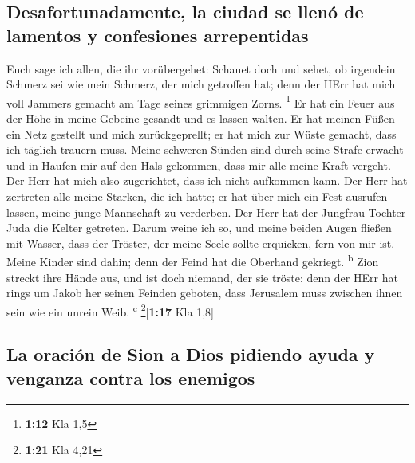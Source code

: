 \hypertarget{desafortunadamente-la-ciudad-se-llenuxf3-de-lamentos-y-confesiones-arrepentidas}{%
\subsection{Desafortunadamente, la ciudad se llenó de lamentos y
confesiones
arrepentidas}\label{desafortunadamente-la-ciudad-se-llenuxf3-de-lamentos-y-confesiones-arrepentidas}}

 Euch sage ich allen, die ihr vorübergehet: Schauet doch
und sehet, ob irgendein Schmerz sei wie mein Schmerz, der mich getroffen
hat; denn der HErr hat mich voll Jammers gemacht am Tage seines
grimmigen Zorns. \footnote{\textbf{1:12} Kla 1,5}  Er hat
ein Feuer aus der Höhe in meine Gebeine gesandt und es lassen walten. Er
hat meinen Füßen ein Netz gestellt und mich zurückgeprellt; er hat mich
zur Wüste gemacht, dass ich täglich trauern muss.  Meine
schweren Sünden sind durch seine Strafe erwacht und in Haufen mir auf
den Hals gekommen, dass mir alle meine Kraft vergeht. Der Herr hat mich
also zugerichtet, dass ich nicht aufkommen kann.  Der
Herr hat zertreten alle meine Starken, die ich hatte; er hat über mich
ein Fest ausrufen lassen, meine junge Mannschaft zu verderben. Der Herr
hat der Jungfrau Tochter Juda die Kelter getreten.  Darum
weine ich so, und meine beiden Augen fließen mit Wasser, dass der
Tröster, der meine Seele sollte erquicken, fern von mir ist. Meine
Kinder sind dahin; denn der Feind hat die Oberhand gekriegt.
\textsuperscript{b}  Zion streckt ihre Hände aus, und ist
doch niemand, der sie tröste; denn der HErr hat rings um Jakob her
seinen Feinden geboten, dass Jerusalem muss zwischen ihnen sein wie ein
unrein Weib. \textsuperscript{c} \footnote{\textbf{1:21} Kla 4,21}{[}\textbf{1:17}
Kla 1,8{]}

\hypertarget{la-oraciuxf3n-de-sion-a-dios-pidiendo-ayuda-y-venganza-contra-los-enemigos}{%
\subsection{La oración de Sion a Dios pidiendo ayuda y venganza contra
los
enemigos}\label{la-oraciuxf3n-de-sion-a-dios-pidiendo-ayuda-y-venganza-contra-los-enemigos}}

